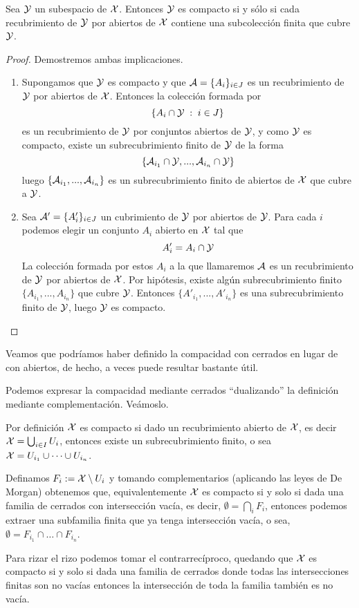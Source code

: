 \begin{prop}
		Sea $\mathcal{Y}$ un subespacio de $\mathcal{X}$. Entonces $\mathcal{Y}$ es compacto si y sólo si cada recubrimiento de $\mathcal{Y}$ por abiertos de $\mathcal{X}$ contiene una subcolección finita que cubre $\mathcal{Y}$.
\end{prop}
\begin{proof} Demostremos ambas implicaciones.
	\begin{enumerate}
		\item[\bra] Supongamos que $\mathcal{Y}$ es compacto y que $\mathcal{A}=\{A_i\}_{i \in J}$ es un recubrimiento de $\mathcal{Y}$ por abiertos de $\mathcal{X}$. Entonces la colección formada por
		\begin{equation*}
		\{A_i \cap \mathcal{Y} \;:\; i \in J\}
		\end{equation*} es un recubrimiento de $\mathcal{Y}$ por conjuntos abiertos de $\mathcal{Y}$, y como $\mathcal{Y}$ es compacto, existe un subrecubrimiento finito de $\mathcal{Y}$ de la forma
		\begin{equation*}
		\{\mathcal{A}_{i_1} \cap \mathcal{Y}, ... , \mathcal{A}_{i_n} \cap \mathcal{Y}\} 
		\end{equation*}
		luego $\{\mathcal{A}_{i_1}, ... , \mathcal{A}_{i_n}\}$ es un subrecubrimiento finito de abiertos de $\mathcal{X}$ que cubre a $\mathcal{Y}$.
		\item[\bla] Sea $\mathcal{A}'=\{A'_{i}\}_{i\in J}$ un cubrimiento de $\mathcal{Y}$ por abiertos de $\mathcal{Y}$. Para cada $i$ podemos elegir un conjunto $A_i$ abierto en $\mathcal{X}$ tal que 
		\begin{equation*}
		A'_i=A_i \cap \mathcal{Y}
		\end{equation*}
		La colección formada por estos $A_i$ a la que llamaremos $\mathcal{A}$ es un recubrimiento de $\mathcal{Y}$ por abiertos de $\mathcal{X}$. Por hipótesis, existe algún subrecubrimiento finito $\{A_{i_1},...,A_{i_n}\}$ que cubre $\mathcal{Y}$. Entonces $\{A'_{i_1},...,A'_{i_n}\}$ es una subrecubrimiento finito de $\mathcal{Y}$, luego $\mathcal{Y}$ es compacto. \qedhere
	\end{enumerate}
\end{proof}
Veamos que podríamos haber definido la compacidad con cerrados en lugar de con abiertos, de hecho, a veces puede resultar bastante útil.
\begin{obs}
	Podemos expresar la compacidad mediante cerrados ``dualizando'' la definición mediante complementación. Veámoslo.
	
	Por definición $\mathcal{X}$ es compacto si dado un recubrimiento abierto de $\mathcal{X}$, es decir $\mathcal{X} = \bigcup_{i\in I}U_i$, entonces existe un subrecubrimiento finito, o sea $\mathcal{X} = U_{i_1} \cup \dots \cup U_{i_n}$.
	
	Definamos $F_i:=\mathcal{X}\setminus U_i$ y tomando complementarios (aplicando las leyes de De Morgan) obtenemos que, equivalentemente $\mathcal{X}$ es compacto si y solo si dada una familia de cerrados con intersección vacía, es decir, $\emptyset = \bigcap_{i}F_i$, entonces podemos extraer una subfamilia finita que ya tenga intersección vacía, o sea, $\emptyset = F_{i_1} \cap \dots \cap F_{i_n}$.
	
	Para rizar el rizo podemos tomar el contrarrecíproco, quedando que $\mathcal{X}$ es compacto si y solo si dada una familia de cerrados donde todas las intersecciones finitas son no vacías entonces la intersección de toda la familia también es no vacía.
\end{obs}

